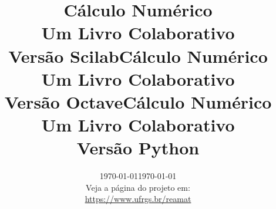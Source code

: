 \documentclass[12pt]{book}
\begin{document}
\frontmatter

\ifisscilab
\title{Cálculo Numérico\\\small{Um Livro Colaborativo}\\\small{Versão Scilab}}
\fi
\ifisoctave
\title{Cálculo Numérico\\\small{Um Livro Colaborativo}\\\small{Versão Octave}}
\fi
\ifispython
\title{Cálculo Numérico\\\small{Um Livro Colaborativo}\\\small{Versão Python}}
\fi
\author{}
\ifishtml
\date{\today}
\else
\date{\today\vspace{1cm}\\\small{Veja a página do projeto em:\\
\url{https://www.ufrgs.br/reamat}
}
}
\fi
\ifishtml
\else
{}
\fi

\ifishtml
\else
\AddToShipoutPicture*{\BackgroundPic}
\fi
\maketitle







\ifisslide
\tableofcontents
\else
\ifishtml
\else
\tableofcontents
{}
\fi
\fi

\mainmatter







%




%

%




%
%




\ifisscilab
\appendix

\fi
\ifisoctave
\appendix

\fi
\ifispython
\appendix

\fi
\fi
\ifisjupyter
\appendix

\fi
\end{document}
